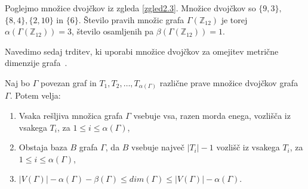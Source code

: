 \documentclass[mat1, tisk]{fmfdelo}
\newcommand{\Z}{\mathbb Z}
\begin{document}
%
\begin{zgled}
  Poglejmo množice dvojčkov iz zgleda \ref{zgled2.3}. Množice dvojčkov so 
  $\{9,3\},$ $\{8,4\},\{2,10\}$ in $\{6\}$. Število pravih množic grafa $\Gamma(\Z_{12})$ 
  je torej $\alpha(\Gamma(\Z_{12})) = 3$, število osamljenih pa $\beta(\Gamma(\Z_{12})) = 1$.
\end{zgled}
%
Navedimo sedaj trditev, ki uporabi množice dvojčkov za omejitev metrične 
dimenzije grafa~\cite{3pirzada14}.
%
\begin{trditev}\label{trditev2.14}
  Naj bo $\Gamma$ povezan graf in $T_1, T_2, \ldots, T_{\alpha(\Gamma)}$ različne 
  prave množice dvojčkov grafa $\Gamma$. Potem velja:
  \begin{enumerate}[label=(\roman*)]
    \item Vsaka rešljiva množica grafa $\Gamma$ vsebuje vsa, razen morda enega, vozlišča iz 
          vsakega $T_i$, za $1 \leq i \leq \alpha(\Gamma)$,
    \item Obstaja baza $B$ grafa $\Gamma$, da $B$ vsebuje največ $|T_i| - 1$ vozlišč 
          iz vsakega $T_i$, za $1 \leq i \leq \alpha(\Gamma)$,
    \item $|V(\Gamma)| - \alpha(\Gamma) - \beta(\Gamma) \leq dim(\Gamma) \leq |V(\Gamma)| - \alpha(\Gamma)$.
  \end{enumerate}
\end{trditev}
\end{document}
